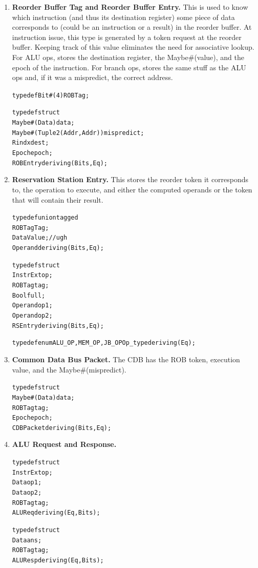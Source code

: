 \documentclass[12pt]{article}
\begin{document}
\begin{enumerate}
    \item \textbf{Reorder Buffer Tag and Reorder Buffer Entry.} This is used to know which instruction (and thus its destination register) some piece of data corresponds to (could be an instruction or a result) in the reorder buffer. At instruction issue, this type is generated by a token request at the reorder buffer. Keeping track of this value eliminates the need for associative lookup. For ALU ops, stores the destination register, the Maybe\#(value), and the epoch of the instruction. For branch ops, stores the same stuff as the ALU ops and, if it was a mispredict, the correct address.
    \begin{alltt}
        typedef Bit#(4) ROBTag;
        
        typedef struct {
            Maybe#(Data) data;
            Maybe#(Tuple2(Addr,Addr)) mispredict;
            Rindx dest;
            Epoch epoch;
        } ROBEntry deriving (Bits, Eq);
    \end{alltt}
    \item \textbf{Reservation Station Entry.} This stores the reorder token it corresponds to, the operation to execute, and either the computed operands or the token that will contain their result. 
    \begin{alltt}
        typedef union tagged {
            ROBTag Tag;
            Data Value; // ugh
        } Operand deriving (Bits, Eq);
        
        typedef struct {
            InstrExt op;
            ROBTag tag;
            Bool full;
            Operand op1;
            Operand op2;
        } RSEntry deriving (Bits, Eq);
        
        typedef enum {ALU_OP, MEM_OP, JB_OP} Op_type deriving(Eq);    
    \end{alltt}
    \item \textbf{Common Data Bus Packet.} The CDB has the ROB token, execution value, and the Maybe\#(mispredict). 
    \begin{alltt}
        typedef struct {
            Maybe#(Data) data;
            ROBTag tag;
            Epoch epoch;
        } CDBPacket deriving (Bits, Eq);
    \end{alltt}
    \item \textbf{ALU Request and Response.}
    \begin{alltt}
        typedef struct {
            InstrExt  op;
            Data      op1;
            Data      op2;
            ROBTag    tag;
        } ALUReq deriving (Eq, Bits);

        typedef struct {
            Data   ans;
            ROBTag tag;
        } ALUResp deriving(Eq,Bits);
    \end{alltt}
\end{enumerate}
\end{document}
